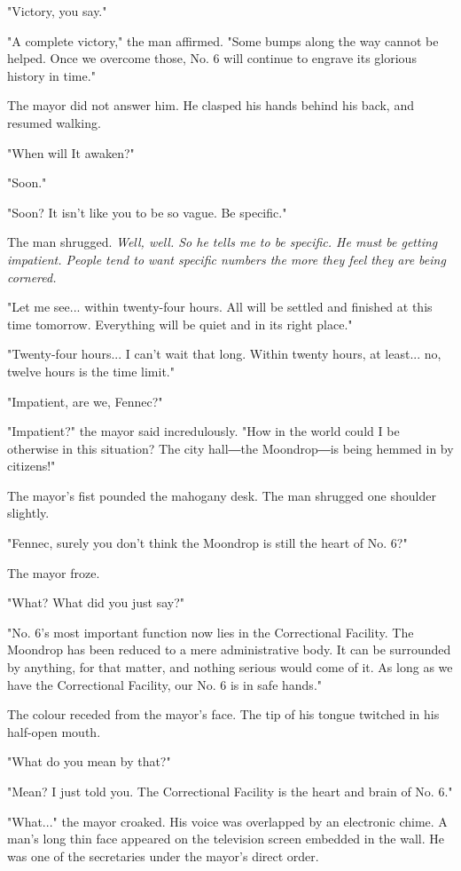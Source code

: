 "Victory, you say."

"A complete victory," the man affirmed. "Some bumps along the way cannot
be helped. Once we overcome those, No. 6 will continue to engrave its
glorious history in time."

The mayor did not answer him. He clasped his hands behind his back, and
resumed walking.

"When will It awaken?"

"Soon."

"Soon? It isn't like you to be so vague. Be specific."

The man shrugged. \emph{Well, well. So he tells me to be specific. He must be
getting impatient. People tend to want specific numbers the more they
feel they are being cornered.}

"Let me see... within twenty-four hours. All will be settled and
finished at this time tomorrow. Everything will be quiet and in its
right place."

"Twenty-four hours... I can't wait that long. Within twenty hours, at
least... no, twelve hours is the time limit."

"Impatient, are we, Fennec?"

"Impatient?" the mayor said incredulously. "How in the world could I be
otherwise in this situation? The city hall―the Moondrop―is being hemmed
in by citizens!"

The mayor's fist pounded the mahogany desk. The man shrugged one
shoulder slightly.

"Fennec, surely you don't think the Moondrop is still the heart of No.
6?"

The mayor froze.

"What? What did you just say?"

"No. 6's most important function now lies in the Correctional Facility.
The Moondrop has been reduced to a mere administrative body. It can be
surrounded by anything, for that matter, and nothing serious would come
of it. As long as we have the Correctional Facility, our No. 6 is in
safe hands."

The colour receded from the mayor's face. The tip of his tongue twitched
in his half-open mouth.

"What do you mean by that?"

"Mean? I just told you. The Correctional Facility is the heart and brain
of No. 6."

"What..." the mayor croaked. His voice was overlapped by an electronic
chime. A man's long thin face appeared on the television screen embedded
in the wall. He was one of the secretaries under the mayor's direct
order.

